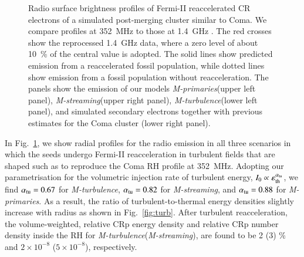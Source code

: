 \documentclass[fleqn,usenatbib,useAMS]{mnras}
\newcommand{\Mstream}{{\it M-streaming}\xspace}
\newcommand{\Mflatturb}{{\it M-turbulence}\xspace}
\newcommand{\Mprimary}{{\it M-primaries}\xspace}
\newcommand{\eps}{\varepsilon}
\begin{document}
\begin{figure}
\begin{minipage}{1\columnwidth}
\begin{center}
   \end{center}
\end{minipage}
\caption{Radio surface brightness profiles of Fermi-II reaccelerated
  CR electrons of a simulated post-merging cluster similar to Coma. We
  compare profiles at 352~MHz \citep[blue lines and
    crosses,][]{brown11} to those at 1.4~GHz \citep[green lines and
    crosses,][]{deiss97}. The red crosses show the reprocessed 1.4~GHz
  data, where a zero level of about 10~\% of the central value is
  adopted. The solid lines show predicted emission from a
  reaccelerated fossil population, while dotted lines show emission
  from a fossil population without reacceleration. The panels show the
  emission of our models \Mprimary (upper left panel), \Mstream (upper
  right panel), \Mflatturb (lower left panel), and simulated secondary
  electrons together with previous estimates \citep{brunetti12} for
  the Coma cluster (lower right panel).}
  \label{fig:sync_profile}
\end{figure}

In Fig.~\ref{fig:sync_profile}, we show radial profiles for the radio
emission in all three scenarios in which the seeds undergo Fermi-II
reacceleration in turbulent fields that are shaped such as to
reproduce the Coma RH profile at 352~MHz.  Adopting our
parametrisation for the volumetric injection rate of turbulent energy,
$I_0\propto \eps_\rmn{th}^{\alpha_\rmn{tu}}$, we find
$\alpha_{\mathrm{tu}}= 0.67$ for \Mflatturb, $\alpha_{\mathrm{tu}}= 0.82$ for
\Mstream, and $\alpha_{\mathrm{tu}}= 0.88$ for \Mprimary. As a result, the
ratio of turbulent-to-thermal energy densities slightly increase with
radius as shown in Fig.~\ref{fig:turb}.  After turbulent
reacceleration, the volume-weighted, relative CRp energy density and
relative CRp number density inside the RH for \Mflatturb (\Mstream),
are found to be 2 (3) \% and $2\times10^{-8}$ ($5\times10^{-8}$),
respectively.

\end{document}
